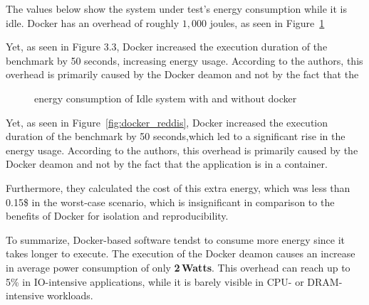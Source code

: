 The values below show the system under test's energy consumption while it is idle.
Docker has an overhead of roughly $1,000$  joules, as seen in Figure~\ref{fig:docker_idle}


Yet, as seen in Figure 3.3, Docker increased the execution duration of the benchmark by 50 seconds, increasing energy usage.
According to the authors, this overhead is primarily caused by the Docker deamon and not by the fact that the


\begin{figure}
    \caption{energy consumption of Idle system with and without docker \cite{santos2018does}}\label{fig:docker_idle}
\end{figure}

Yet, as seen in Figure~\ref{fig:docker_reddis}, Docker increased the execution duration of the benchmark by 50 seconds,which led to a significant rise in the energy usage.
According to the authors, this overhead is primarily caused by the Docker deamon and not by the fact that  the application is in a container.


Furthermore, they calculated the cost of this extra energy, which was less than 0.15\$ in the worst-case scenario, which is insignificant in comparison to the benefits of Docker for isolation and reproducibility.

To summarize, Docker-based software tendst to consume more energy since it takes longer to execute.
The execution of the Docker deamon causes an increase in average power consumption of only \textbf{2\,Watts}.
This overhead can reach up to 5\% in IO-intensive applications, while it is barely visible in CPU- or DRAM-intensive workloads.



